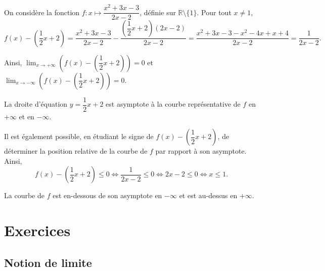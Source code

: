 \documentclass[11pt,fleqn, openany]{book} %
\begin{document}
\begin{example} On considère la fonction $f:x\mapsto \dfrac{x^2+3x-3}{2x-2}$, définie sur $\mathbb{R}\setminus \{1\}$. Pour tout $x\neq 1$, 
\[f(x)-\left(\dfrac{1}{2}x+2\right)=\dfrac{x^2+3x-3}{2x-2}-\dfrac{\left(\dfrac{1}{2}x+2\right)(2x-2)}{2x-2}=\dfrac{x^2+3x-3-x^2-4x+x+4}{2x-2}=\dfrac{1}{2x-2}.\]

Ainsi, $\displaystyle \lim_{x \to +\infty} \left(f(x)-\left(\dfrac{1}{2}x+2\right)\right)=0$ et $\displaystyle \lim_{x \to -\infty} \left(f(x)-\left(\dfrac{1}{2}x+2\right)\right)=0$. 

La droite d'équation $y=\dfrac{1}{2}x+2$ est asymptote à la courbe représentative de $f$ en $+\infty$ et en $-\infty$.

Il est également possible, en étudiant le signe de $f(x)-\left(\dfrac{1}{2}x+2\right)$, de déterminer la position relative de la courbe de $f$ par rapport à son asymptote.
Ainsi, 
\[ f(x)-\left(\dfrac{1}{2}x+2\right) \leqslant 0 \Leftrightarrow \dfrac{1}{2x-2} \leqslant 0 \Leftrightarrow 2x-2 \leqslant 0 \Leftrightarrow x\leqslant 1.\]

La courbe de $f$ est en-dessous de son asymptote en $-\infty$ et est au-dessus en $+\infty$.

\begin{center}
\end{center}
\vspace{-1cm}\end{example}

\chapter{Exercices}

\section*{Notion de limite}
\end{document}
